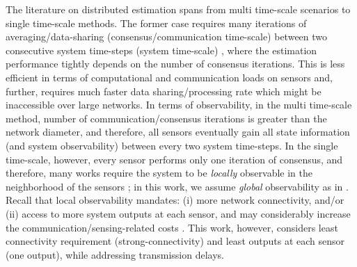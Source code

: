 \documentclass[journal]{IEEEtran}
\newcommand{\tb}{\color{blue}}
\begin{document}
The literature on distributed estimation spans from multi time-scale scenarios to single time-scale methods.  
The former case  requires many iterations of averaging/data-sharing (consensus/communication time-scale) between two consecutive system time-steps (system time-scale) \cite{he2019secure,battilotti2021stability}, where the estimation performance tightly depends on the number of consensus iterations. This  is less efficient in terms of computational and communication loads on sensors and, further, requires much faster data sharing/processing rate which might be inaccessible over large networks. In terms of observability, in the multi time-scale method, number of communication/consensus iterations is greater than the network diameter, and therefore, all sensors eventually gain all state information (and system observability)  between every two system time-steps. In the single time-scale, however, every sensor performs only one iteration of consensus, and therefore, many works require the system to be \textit{locally} observable in the neighborhood of the sensors \cite{kar2014distributed,sayed-kf,das2016consensus,mohammadi2015distributed,mo2020distributed,jenabzadeh2020distributed,zou2019moving,liu2017distributed}; in this work, we assume \textit{global} observability as in \cite{jstsp,silm2020simple,mitra2018distributed,icassp13}. Recall that local observability mandates: (i) more network connectivity, and/or (ii)  access to more system outputs at each sensor, and may considerably increase the communication/sensing-related costs \cite{pequito2014optimal,spl18,lcss2020}. This work, however, considers least connectivity requirement   (strong-connectivity) and least outputs at each sensor (one output), while addressing transmission delays.
\end{document}
